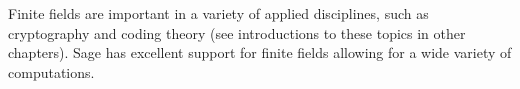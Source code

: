 Finite fields are important in a variety of applied disciplines, such as cryptography and coding theory (see introductions to these topics in other chapters).  Sage has excellent support for finite fields allowing for a wide variety of computations.